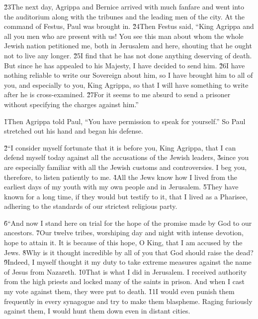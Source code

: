 \v{23}The next day, Agrippa and Bernice arrived with much fanfare and went into the auditorium along with the tribunes and the leading men of the city. At the command of Festus, Paul was brought in. \v{24}Then Festus said, ``King Agrippa and all you men who are present with us! You see this man about whom the whole Jewish nation petitioned me, both in Jerusalem and here, shouting that he ought not to live any longer. \v{25}I find that he has not done anything deserving of death. But since he has appealed to his Majesty, I have decided to send him. \v{26}I have nothing reliable to write our Sovereign about him, so I have brought him to all of you, and especially to you, King Agrippa, so that I will have something to write after he is cross-examined. \v{27}For it seems to me absurd to send a prisoner without specifying the charges against him.''

\v{1}Then Agrippa told Paul, ``You have permission to speak for yourself.'' So Paul stretched out his hand and began his defense.

\v{2}``I consider myself fortunate that it is before you, King Agrippa, that I can defend myself today against all the accusations of the Jewish leaders, \v{3}since you are especially familiar with all the Jewish customs and controversies. I beg you, therefore, to listen patiently to me. \v{4}All the Jews know how I lived from the earliest days of my youth with my own people and in Jerusalem. \v{5}They have known for a long time, if they would but testify to it, that I lived as a Pharisee, adhering to the standards of our strictest religious party.

\v{6}``And now I stand here on trial for the hope of the promise made by God to our ancestors. \v{7}Our twelve tribes, worshiping day and night with intense devotion, hope to attain it. It is because of this hope, O King, that I am accused by the Jews. \v{8}Why is it thought incredible by all of you that God should raise the dead? \v{9}Indeed, I myself thought it my duty to take extreme measures against the name of Jesus from Nazareth. \v{10}That is what I did in Jerusalem. I received authority from the high priests and locked many of the saints in prison. And when I cast my vote against them, they were put to death. \v{11}I would even punish them frequently in every synagogue and try to make them blaspheme. Raging furiously against them, I would hunt them down even in distant cities.

